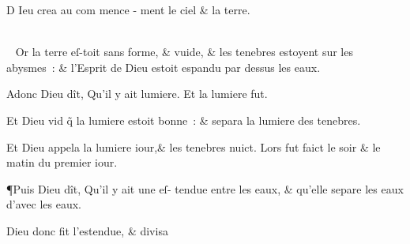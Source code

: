 \documentclass[twocolumn,paper=a4,pagesize=pdftex,12pt,headinclude=on]{scrbook}
\newcounter{verse}
\newcommand{\bverse}{%
  \linebreak
  \addtocounter{verse}{1}
  \theverse\quad
}
\newcommand{\bversenopar}[1][\indent]{%
   \addtocounter{verse}{1}\\#1\theverse~
}
\newcommand{\bversenonum}{%
   \addtocounter{verse}{1}
   \par
}
\begin{document}
\vspace{\baselineskip}

\bversenonum \lettrine[lines=10,image=true,loversize=0.05,lraise=-0.03]{D}{}%
 \footnotemarkverse{}Ieu
 \footnotemarkmain{}crea
 \footnotemarkmain{}au com \linebreak
 mence - ment
 \footnotemarkmain{}le ciel \& la terre.
\bversenopar[]Or la\linebreak
 terre eſ-\linebreak toit sans forme, \& \linebreak
 vuide, \& les tenebres estoyent sur les
abysmes~: \& l'Esprit de Dieu
 \footnotemarkmain{}estoit
 espandu par dessus les eaux.
\bverse Adonc Dieu dît,
 \footnotemarkverse{}Qu'il y ait lumie\-re.
 \footnotemarkmain{}Et la lumiere fut.
\bverse Et Dieu vid \~q la lumiere estoit bon\-ne~: \& separa la lumiere des tenebres.
\bverse Et Dieu appela la lumiere iour,\& les
 tenebres nuict. Lors fut faict le
 \footnotemarkmain{}soir \& le matin 
 du premier iour.
\bverse ¶Puis Dieu dît,%
 \footnotemarkverse{}Qu'il y ait une
 \footnotemarkmain{}eſ-\linebreak
 tendue entre les eaux,
 \& qu'elle separe les
 \footnotemarkmain{}eaux d'avec les eaux.
\bverse Dieu donc fit l'estendue, \& divisa\linebreak
\end{document}
